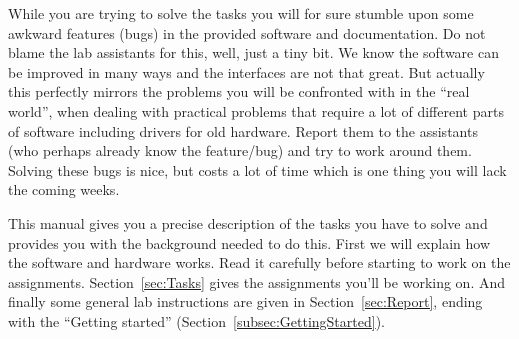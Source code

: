 \documentclass[10pt]{scrartcl}
\begin{document}
While you are trying to solve the tasks you will for sure stumble upon
some awkward features (bugs) in the provided software and documentation.
Do not blame the lab assistants for this, well, just a tiny bit. We know
the software can be improved in many ways and the interfaces are not
that great.
But actually this perfectly mirrors the problems you will be confronted
with in the ``real world'', when dealing with practical problems that
require a lot of different parts of software including drivers for old
hardware. Report them to the assistants (who perhaps already know the
feature/bug) and try to work around them. Solving these bugs is nice, but
costs a lot of time which is one thing you will lack the coming weeks.

This manual gives you a precise description of the tasks you have to
solve and provides you with the background needed to do this. First we
will explain how the software and hardware works. Read it carefully
before starting to work on the assignments.  Section~\ref{sec:Tasks}
gives the assignments you'll be working on. And finally some  general lab
instructions are given in Section~\ref{sec:Report}, ending with the ``Getting started''
(Section~\ref{subsec:GettingStarted}).

\end{document}
